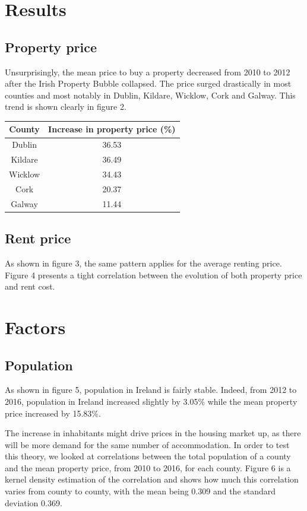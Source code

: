 \documentclass[twocolumn]{article}
\begin{document}
\section{Results}
\subsection{Property price}
Unsurprisingly, the mean price to buy a property decreased from 2010 to 2012 after the Irish Property Bubble collapsed. The price surged drastically in most counties and most notably in Dublin, Kildare, Wicklow, Cork and Galway. This trend is shown clearly in figure 2. \begin{center}
\begin{tabular}{||c c||}
 \hline
 County & Increase in property price (\%) \\ [0.5ex]
 \hline\hline
 Dublin & 36.53 \\
 \hline
 Kildare & 36.49 \\
 \hline
 Wicklow & 34.43 \\
 \hline
 Cork & 20.37 \\
 \hline
 Galway & 11.44 \\ [1ex]
 \hline
\end{tabular}
\end{center}

\subsection{Rent price}
As shown in figure 3, the same pattern applies for the average renting price. Figure 4 presents a tight correlation between the evolution of both property price and rent cost.

\section{Factors}
\subsection{Population}
As shown in figure 5, population in Ireland is fairly stable. Indeed, from 2012 to 2016, population in Ireland increased slightly by 3.05\% while the mean property price increased by 15.83\%.

The increase in inhabitants might drive prices in the housing market up, as there will be more demand for the same number of accommodation. In order to test this theory, we looked at correlations between the total population of a county and the mean property price, from 2010 to 2016, for each county. Figure 6 is a kernel density estimation of the correlation and shows how much this correlation varies from county to county, with the mean being 0.309 and the standard deviation 0.369.
\end{document}
